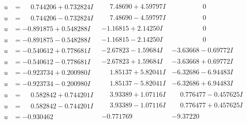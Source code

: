 \documentclass[1p]{elsarticle_modified}
\theoremstyle{definition}
\begin{document}
$$\begin{array}{c|c|c}
\begin{aligned}
u &= \phantom{-}0.744206 + 0.732824 I\end{aligned}
 & \phantom{-}7.48690 + 4.59797 I & \phantom{-0.000000 } 0 \\ \hline\begin{aligned}
u &= \phantom{-}0.744206 - 0.732824 I\end{aligned}
 & \phantom{-}7.48690 - 4.59797 I & \phantom{-0.000000 } 0 \\ \hline\begin{aligned}
u &= -0.891875 + 0.548288 I\end{aligned}
 & -1.16815 + 2.14250 I & \phantom{-0.000000 } 0 \\ \hline\begin{aligned}
u &= -0.891875 - 0.548288 I\end{aligned}
 & -1.16815 - 2.14250 I & \phantom{-0.000000 } 0 \\ \hline\begin{aligned}
u &= -0.540612 + 0.778681 I\end{aligned}
 & -2.67823 - 1.59684 I & -3.63668 - 0.69772 I \\ \hline\begin{aligned}
u &= -0.540612 - 0.778681 I\end{aligned}
 & -2.67823 + 1.59684 I & -3.63668 + 0.69772 I \\ \hline\begin{aligned}
u &= -0.923734 + 0.200980 I\end{aligned}
 & \phantom{-}1.85137 + 5.82041 I & -6.32686 - 6.94483 I \\ \hline\begin{aligned}
u &= -0.923734 - 0.200980 I\end{aligned}
 & \phantom{-}1.85137 - 5.82041 I & -6.32686 + 6.94483 I \\ \hline\begin{aligned}
u &= \phantom{-}0.582842 + 0.744201 I\end{aligned}
 & \phantom{-}3.93389 + 1.07116 I & \phantom{-}0.776477 - 0.457625 I \\ \hline\begin{aligned}
u &= \phantom{-}0.582842 - 0.744201 I\end{aligned}
 & \phantom{-}3.93389 - 1.07116 I & \phantom{-}0.776477 + 0.457625 I \\ \hline\begin{aligned}
u &= -0.930462\phantom{ +0.000000I}\end{aligned}
 & -0.771769\phantom{ +0.000000I} & -9.37220\phantom{ +0.000000I} \\ \hline\begin{aligned}

\end{aligned}
\end{array}$$
\end{document}
